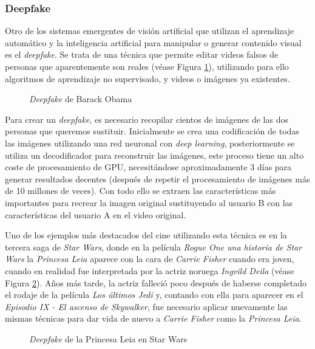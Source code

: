 \subsubsection{Deepfake}

Otro de los sistemas emergentes de visión artificial que utilizan el aprendizaje automático y la inteligencia artificial para manipular o generar contenido visual es el \textit{deepfake}. Se trata de una técnica que permite editar videos falsos de personas que aparentemente son reales (véase Figura \ref{fig:Obama}), utilizando para ello algoritmos de aprendizaje no supervisado, y videos o imágenes ya existentes. 

\begin{figure}[h!]
    \centering
    \caption{\textit{Deepfake} de Barack Obama}
    \label{fig:Obama}  
\end{figure}

Para crear un \textit{deepfake}\cite{Deepfake}, es necesario recopilar cientos de imágenes de las dos personas que queremos sustituir. Inicialmente se crea una codificación de todas las imágenes utilizando una red neuronal con \textit{deep learning}, posteriormente se utiliza un decodificador para reconstruir las imágenes, este proceso tiene un alto coste de procesamiento de GPU, necesitándose aproximadamente 3 días para generar resultados decentes (después de repetir el procesamiento de imágenes más de 10 millones de veces). Con todo ello se extraen las características más importantes para recrear la imagen original sustituyendo al usuario B con las características del usuario A en el video original.

Uno de los ejemplos más destacados del cine utilizando esta técnica es en la tercera saga de \textit{Star Wars}, donde en la película \textit{Rogue One una historia de Star Wars} la \textit{Princesa Leia} aparece con la cara de \textit{Carrie Fisher} cuando era joven, cuando en realidad fue interpretada por la actriz noruega \textit{Ingvild Deila} (véase Figura \ref{fig:Leia}). Años más tarde, la actriz falleció poco después de haberse completado el rodaje de la película \textit{Los últimos Jedi} y, contando con ella para aparecer en el \textit{Episodio IX - El ascenso de Skywalker}, fue necesario aplicar nuevamente las mismas técnicas para dar vida de nuevo a \textit{Carrie Fisher} como la \textit{Princesa Leia}.

\begin{figure}[h!]
    \centering
    \caption{\textit{Deepfake} de la Princesa Leia en Star Wars}
    \label{fig:Leia}  
\end{figure}

